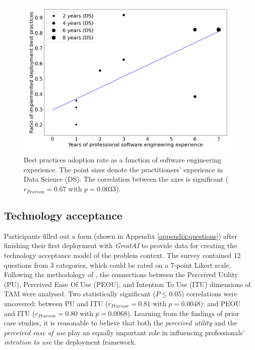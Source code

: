 \begin{figure}
    \centering
    \includegraphics[width=0.6\linewidth]{figures/best-practices.png}
    \captionsetup{width=.9\linewidth}
    \caption{Best practices adoption rate as a function of software engineering experience. The point sizes denote the practitioners' experience in Data Science (DS). The correlation between the axes is significant ($r_{Pearson} = 0.67$ with $p = 0.0033$).}
    \label{fig:adoption}
\end{figure}

\subsection{Technology acceptance}

Participants filled out a form (shown in Appendix \ref{appendix:questions}) after finishing their first deployment with \textit{GreatAI} to provide data for creating the technology acceptance model of the problem context. The survey contained 12 questions from 3 categories, which could be rated on a 7-point Likert scale. Following the methodology of \cite{cruz2019catalog}, the connections between the Perceived Utility (PU), Perceived Ease Of Use (PEOU), and Intention To Use (ITU) dimensions of TAM were analysed. Two statistically significant ($P \leq 0.05$) correlations were uncovered: between PU and ITU ($r_{Pearson} = 0.81$ with $p = 0.0048$); and PEOU and ITU ($r_{Pearson} = 0.80$ with $p = 0.0068$). Learning from the findings of prior case studies, it is reasonable to believe that both the \textit{perceived utility} and the \textit{perceived ease of use} play an equally important role in influencing professionals' \textit{intention to use} the deployment framework.

